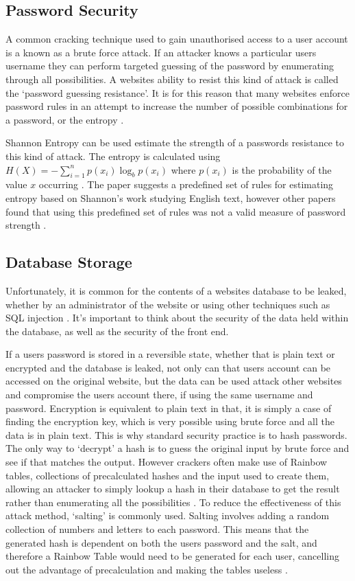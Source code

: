 \subsection{Password Security}

A common cracking technique used to gain unauthorised access to a user account is a known as a brute force attack. If an attacker knows a particular users username they can perform targeted guessing of the password by enumerating through all possibilities. A websites ability to resist this kind of attack is called the `password guessing resistance'. It is for this reason that many websites enforce password rules in an attempt to increase the number of possible combinations for a password, or the entropy \cite{helkala2008authentication}.

Shannon Entropy can be used estimate the strength of a passwords resistance to this kind of attack. The entropy is calculated using $H(X)= -\sum_{i=1}^n{p(x_i)\log_b p(x_i)}$ where $p(x_i)$ is the probability of the value $x$ occurring \cite{burr2013electronic}.
%
The paper suggests a predefined set of rules for estimating entropy based on Shannon's work studying English text, however other papers found that using this predefined set of rules was not a valid measure of password strength \cite{weir2010shannon}.

\subsection{Database Storage} \label{subsection:databasestorage}
Unfortunately, it is common for the contents of a websites database to be leaked, whether by an administrator of the website or using other techniques such as SQL injection \parencite{bbc2012linkedinpasswords,chechik2013passwords}. It's important to think about the security of the data held within the database, as well as the security of the front end.

If a users password is stored in a reversible state, whether that is plain text or encrypted and the database is leaked, not only can that users account can be accessed on the original website, but the data can be used attack other websites and compromise the users account there, if using the same username and password.
%
Encryption is equivalent to plain text in that, it is simply a case of finding the encryption key, which is very possible using brute force and all the data is in plain text. 
%
This is why standard security practice is to hash passwords. The only way to `decrypt' a hash is to guess the original input by brute force and see if that matches the output.
%
However crackers often make use of Rainbow tables, collections of precalculated hashes and the input used to create them, allowing an attacker to simply lookup a hash in their database to get the result rather than enumerating all the possibilities \parencite{jorgensen2012}.
%
To reduce the effectiveness of this attack method, `salting' is commonly used. Salting involves adding a random collection of numbers and letters to each password. This means that the generated hash is dependent on both the users password and the salt, and therefore a Rainbow Table would need to be generated for each user, cancelling out the advantage of precalculation and making the tables useless \parencite{morris1979password}.
